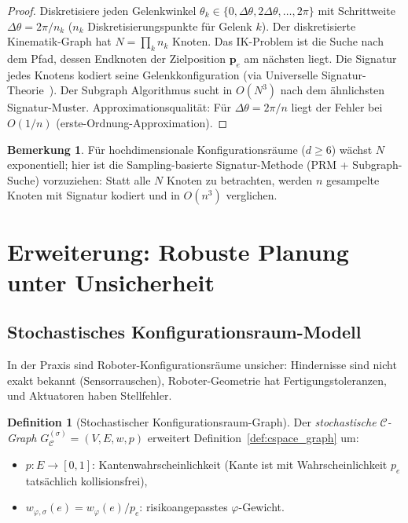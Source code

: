 ﻿\documentclass[a4paper,12pt]{article}
\theoremstyle{definition}
\newtheorem{definition}{Definition}
\newtheorem{bemerkung}{Bemerkung}
\newcommand{\Cspace}{\mathcal{C}}
\begin{document}
\begin{proof}
Diskretisiere jeden Gelenkwinkel $\theta_k \in \{0, \Delta\theta, 2\Delta\theta, \ldots, 2\pi\}$
mit Schrittweite $\Delta\theta = 2\pi/n_k$ ($n_k$ Diskretisierungspunkte f\"ur Gelenk $k$).
Der diskretisierte Kinematik-Graph hat $N = \prod_k n_k$ Knoten.
Das IK-Problem ist die Suche nach dem Pfad, dessen Endknoten
der Zielposition $\mathbf{p}_e$ am n\"achsten liegt.
Die Signatur jedes Knotens kodiert seine Gelenkkonfiguration
(via Universelle Signatur-Theorie~\cite{epp2026ust}).
Der Subgraph Algorithmus sucht in $O(N^3)$ nach dem
\"ahnlichsten Signatur-Muster.
Approximationsqualit\"at: F\"ur $\Delta\theta = 2\pi/n$
liegt der Fehler bei $O(1/n)$ (erste-Ordnung-Approximation).
\end{proof}

\begin{bemerkung}
F\"ur hochdimensionale Konfigurationsr\"aume ($d \geq 6$) w\"achst $N$ exponentiell;
hier ist die Sampling-basierte Signatur-Methode (PRM + Subgraph-Suche)
vorzuziehen: Statt alle $N$ Knoten zu betrachten, werden $n$ gesampelte
Knoten mit Signatur kodiert und in $O(n^3)$ verglichen.
\end{bemerkung}

\section{Erweiterung: Robuste Planung unter Unsicherheit}

\subsection{Stochastisches Konfigurationsraum-Modell}

In der Praxis sind Roboter-Konfigurationsräume unsicher:
Hindernisse sind nicht exakt bekannt (Sensorrauschen), Roboter-Geometrie
hat Fertigungstoleranzen, und Aktuatoren haben Stellfehler.

\begin{definition}[Stochastischer Konfigurationsraum-Graph]
Der \emph{stochastische $\Cspace$-Graph} $G_{\Cspace}^{(\sigma)} = (V, E, w, p)$
erweitert Definition~\ref{def:cspace_graph} um:
\begin{itemize}
    \item $p: E \to [0,1]$: Kantenwahrscheinlichkeit (Kante ist mit Wahrscheinlichkeit
          $p_e$ tats\"achlich kollisionsfrei),
    \item $w_{\varphi,\sigma}(e) = w_\varphi(e) / p_e$: risikoangepasstes
          $\varphi$-Gewicht.
\end{itemize}
\end{definition}
\end{document}
